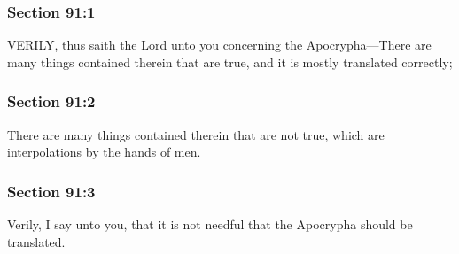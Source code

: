 	\subsubsection{Section 91:1} %
		\label{DC91-1}

		VERILY, thus saith the Lord unto you concerning the Apocrypha---There are many things contained therein that are true, and it is mostly translated correctly;


	\subsubsection{Section 91:2} %
		\label{DC91-2}

		There are many things contained therein that are not true, which are interpolations by the hands of men.


	\subsubsection{Section 91:3} %
		\label{DC91-3}

		Verily, I say unto you, that it is not needful that the Apocrypha should be translated.



